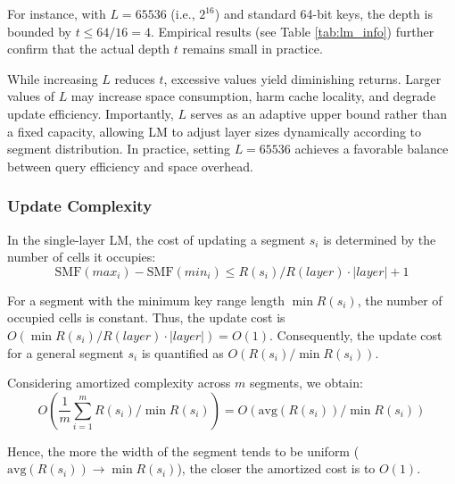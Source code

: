 For instance, with $\mathit{L} = 65536$ (i.e., $2^{16}$) and standard 64-bit keys, the depth is bounded by $t \le 64 / 16 = 4$. Empirical results (see Table \ref{tab:lm_info}) further confirm that the actual depth $t$ remains small in practice.

While increasing $\mathit{L}$ reduces $t$, excessive values yield diminishing returns. Larger values of $\mathit{L}$ may increase space consumption, harm cache locality, and degrade update efficiency. Importantly, $\mathit{L}$ serves as an adaptive upper bound rather than a fixed capacity, allowing LM to adjust layer sizes dynamically according to segment distribution. In practice, setting $\mathit{L} = 65536$ achieves a favorable balance between query efficiency and space overhead.

\subsubsection{Update Complexity}

In the single-layer LM, the cost of updating a segment $s_i$ is determined by the number of cells it occupies:
$$
\text{SMF}(max_i) - \text{SMF}(min_i) \le R(s_i) / R(layer) \cdot |layer| + 1
$$


For a segment with the minimum key range length $\min R(s_i)$, the number of occupied cells is constant. Thus, the update cost is $O\left(\min R(s_i) / R(layer) \cdot |layer|\right) = O(1)$. Consequently, the update cost for a general segment $s_i$ is quantified as $O(R(s_i) / \min R(s_i))$.

Considering amortized complexity across $m$ segments, we obtain:
$$
O\left(\frac{1}{m} \sum_{i=1}^{m} R(s_i) / \min R(s_i) \right) = O\left(\text{avg}(R(s_i))/\min R(s_i)\right)
$$

Hence, the more the width of the segment tends to be uniform ($\text{avg}(R(s_i))\xrightarrow{}\min R(s_i)$), the closer the amortized cost is to $O(1)$.


